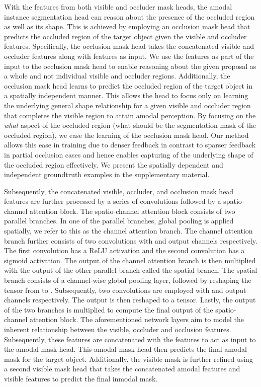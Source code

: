 \documentclass[10pt,twocolumn,letterpaper]{article}
\begin{document}
With the features from both visible and occluder mask heads, the amodal instance segmentation head can reason about the presence of the occluded region as well as its shape. This is achieved by employing an occlusion mask head that predicts the occluded region of the target object given the visible and occluder features. Specifically, the occlusion mask head takes the concatenated visible and occluder features along with  features as input. We use the  features as part of the input to the occlusion mask head to enable reasoning about the given proposal as a whole and not individual visible and occluder regions. Additionally, the occlusion mask head learns to predict the occluded region of the target object in a spatially independent manner. This allows the head to focus only on learning the underlying general shape relationship for a given visible and occluder region that completes the visible region to attain amodal perception. By focusing on the \textit{what} aspect of the occluded region (what should be the segmentation mask of the occluded region), we ease the learning of the occlusion mask head. Our method allows this ease in training due to denser feedback in contrast to sparser feedback in partial occlusion cases and hence enables capturing of the underlying shape of the occluded region effectively. We present the spatially dependent and independent groundtruth examples in the supplementary material.

Subsequently, the concatenated visible, occluder, and occlusion mask head features are further processed by a series of convolutions followed by a spatio-channel attention block. The spatio-channel attention block consists of two parallel branches. In one of the parallel branches, global pooling is applied spatially, we refer to this as the channel attention branch. The channel attention branch further consists of two  convolutions with  and  output channels respectively. The first  convolution has a ReLU activation and the second convolution has a sigmoid activation. The output of the channel attention branch is then multiplied with the output of the other parallel branch called the spatial branch. The spatial branch consists of a channel-wise global pooling layer, followed by reshaping the tensor from  to . Subsequently, two  convolutions are employed with  and  output channels respectively. The output is then reshaped to a  tensor. Lastly, the output of the two branches is multiplied to compute the final output of the spatio-channel attention block. The aforementioned network layers aim to model the inherent relationship between the visible, occluder and occlusion features. Subsequently, these features are concatenated with the  features to act as input to the amodal mask head. This amodal mask head then predicts the final amodal mask for the target object. Additionally, the visible mask is further refined using a second visible mask head that takes the concatenated amodal features and visible features to predict the final inmodal mask.
\end{document}
